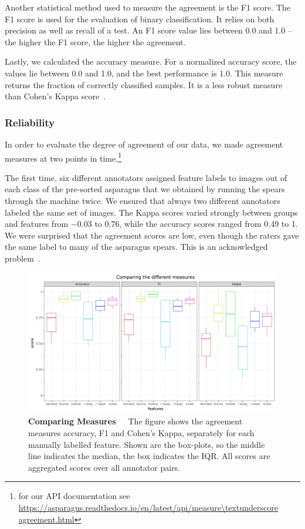 Another statistical method used to measure the agreement is the F1 score. The F1 score is used for the evaluation of binary classification. It relies on both precision as well as recall of a test. An F1 score value lies between 0.0 and 1.0 -- the higher the F1 score, the higher the agreement.

Lastly, we calculated the accuracy measure. For a normalized accuracy score, the values lie between 0.0 and 1.0, and the best performance is 1.0. This measure returns the fraction of correctly classified samples. It is a less robust measure than Cohen’s Kappa score~\citep{mchugh2012interrater}.


\subsubsection{Reliability}
\label{subsec:Reliability}

In order to evaluate the degree of agreement of our data, we made agreement measures at two points in time.\footnote{for our API documentation see \\ \url{https://asparagus.readthedocs.io/en/latest/api/measure\textunderscore agreement.html}}

The first time, six different annotators assigned feature labels to images out of each class of the pre-sorted asparagus that we obtained by running the spears through the machine twice. We ensured that always two different annotators labeled the same set of images. The Kappa scores varied strongly between groups and features from $-0.03$ to 0.76, while the accuracy scores ranged from 0.49 to 1. We were surprised that the agreement scores are low, even though the raters gave the same label to many of the asparagus spears. This is an acknowledged problem~\citep{powers2012problem,sim2005kappa,feinstein1990high,posterFlight}.

\begin{figure}[!ht]
	\centering
	\includegraphics[scale=0.55]{Figures/chapter03/kappa_measurewise.png}
	\decoRule
	\caption[Agreement Measure-Wise Comparison of all Features]{\textbf{Comparing Measures}~~~The figure shows the agreement measures accuracy, F1 and Cohen’s Kappa, separately for each manually labelled feature. Shown are the box-plots, so the middle line indicates the median, the box indicates the IQR. All scores are aggregated scores over all annotator pairs.}
	\label{fig:KappaMeasurewise}
\end{figure}

